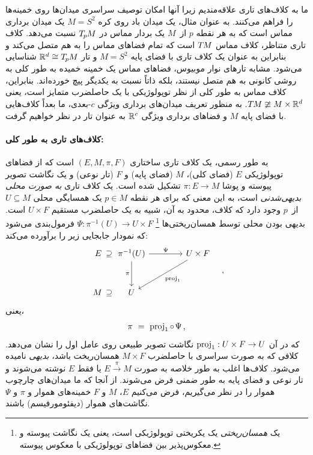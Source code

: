 ما به کلاف‌های تاری علاقه‌مندیم زیرا آنها امکان توصیف سراسری میدان‌ها روی خمینه‌ها را فراهم می‌کنند.
به عنوان مثال، یک میدان باد روی کره $M=S^2$ یک میدان برداری مماس است که به هر نقطه $p$ از~$M$ یک بردار مماس در $T_{\mkern-1.5mu p}\mkern-.5muM$ نسبت می‌دهد.
کلاف تاری متناظر، کلاف مماس $T\mkern-1.5muM$ است که تمام فضاهای مماس را به هم متصل می‌کند و بنابراین به عنوان یک کلاف تاری با فضای پایه $M=S^2$ و تار $\mathbb{R}^d\cong T_{\mkern-1.5mu p}\mkern-.5muM$ شناسایی می‌شود.
مشابه تارهای نوار موبیوس، فضاهای مماس یک خمینه خمیده به طور کلی به روشی کانونی به هم متصل نیستند، بلکه ذاتاً نسبت به یکدیگر پیچ خورده‌اند.
بنابراین، کلاف مماس به طور کلی از نظر توپولوژیکی با یک حاصلضرب متمایز است، یعنی $T\mkern-1.5muM \ncong M\times\mathbb{R}^d$.
به منظور تعریف میدان‌های برداری ویژگی $c$-بعدی، ما بعداً کلاف‌هایی با فضای پایه $M$ و فضاهای برداری ویژگی $\mathbb{R}^c$ به عنوان تار در نظر خواهیم گرفت.


\paragraph{کلاف‌های تاری به طور کلی:}
به طور رسمی، یک کلاف تاری ساختاری $(E,M,\pi,F)$ است که از فضاهای توپولوژیکی $E$ (فضای کلی)، $M$ (فضای پایه) و $F$ (تار نوعی) و یک نگاشت تصویر پیوسته و پوشا $\pi:E\to M$ تشکیل شده است.
یک کلاف تاری \emph{به صورت محلی بدیهی‌شدنی} است، به این معنی که برای هر نقطه $p\in M$ یک همسایگی محلی $U\subseteq M$ از~$p$ وجود دارد که کلاف، محدود به آن، شبیه به یک حاصلضرب مستقیم $U\times F$ است.
بدیهی بودن محلی توسط همسان‌ریختی‌ها%
\footnote{
	یک \emph{همسان‌ریختی} یک یکریختی توپولوژیکی است، یعنی یک نگاشت پیوسته و معکوس‌پذیر بین فضاهای توپولوژیکی با معکوس پیوسته.
}
$\Psi:\pi^{-1}(U)\to U\times F$ فرمول‌بندی می‌شود که نمودار جابجایی زیر را برآورده می‌کند:
\\[-2ex]
\begin{equation}\label{cd:trivialization_general_intro}
\begin{tikzcd}[row sep=3em, column sep=4em]
	\:E\: \supseteq
	&[-4.2em]
	\pi^{-1}(U) \arrow[d, swap, "\pi"] \arrow[r, "\Psi"]
	& U\times F \arrow[ld, "\proj_1"] \\
	M\, \supseteq
	& U
\end{tikzcd}
\quad ,
\end{equation}
یعنی،
\begin{align}\label{eq:local_triviality_proj}
	\pi\ =\  \operatorname{proj}_1 \circ \mkern2mu \Psi \,,
\end{align}
که در آن $\operatorname{proj}_1: U\times F\to U$ نگاشت تصویر طبیعی روی عامل اول را نشان می‌دهد.
کلافی که به صورت سراسری با حاصلضرب $M\times F$ همسان‌ریخت باشد، \emph{بدیهی} نامیده می‌شود.
کلاف‌ها اغلب به طور خلاصه به صورت $E\!\xrightarrow{\pi}\!M$ یا فقط $E$ نوشته می‌شوند و تار نوعی و فضای پایه به طور ضمنی فرض می‌شوند.
از آنجا که ما میدان‌های چارچوب هموار را در نظر می‌گیریم، فرض می‌کنیم $E$، $M$ و $F$ خمینه‌های هموار و $\pi$ و $\Psi$ نگاشت‌های هموار (دیفئومورفیسم) باشند.



